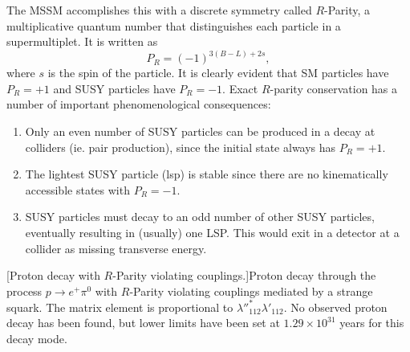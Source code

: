 The MSSM accomplishes this with a discrete symmetry called $R$-Parity, a multiplicative quantum number that distinguishes each particle in a supermultiplet. It is written as
\begin{equation}
P_{R}=(-1)^{3(B-L)+2s},
\end{equation}
where $s$ is the spin of the particle. It is clearly evident that SM particles have $P_{R}=+1$ and SUSY particles have $P_{R}=-1$. Exact $R$-parity conservation has a number of important phenomenological consequences:
\begin{enumerate}
\item Only an even number of SUSY particles can be produced in a decay at colliders (ie. pair production), since the initial state always has $P_{R}=+1$.
\item The lightest SUSY particle (\acrshort{lsp}) is stable since there are no kinematically accessible states with $P_{R}=-1$.
\item SUSY particles must decay to an odd number of other SUSY particles, eventually resulting in (usually) one LSP. This would exit in a detector at a collider as missing transverse energy.
\end{enumerate}
\begin{center}
\vspace{10mm}
[Proton decay with $R$-Parity violating couplings.]{Proton decay through the process $p \rightarrow e^{+}\pi^{0}$ with $R$-Parity violating couplings mediated by a strange squark. The matrix element is proportional to $\lambda''^{*}_{112}\lambda'_{112}$. No observed proton decay has been found, but lower limits have been set at $1.29\times10^{31}$ years \cite{RN551} for this decay mode.}
\label{fig:protondecay}
\end{center}

